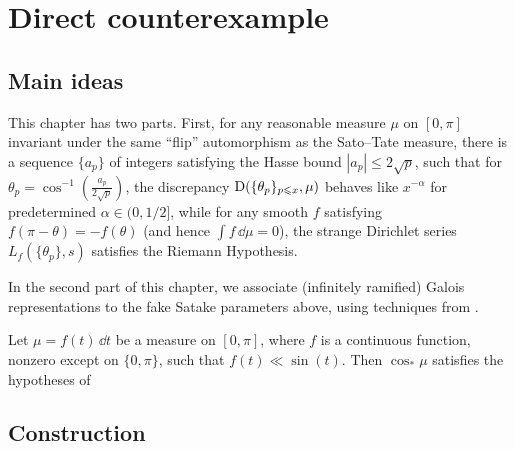 
\chapter{Direct counterexample}





\section{Main ideas}

This chapter has two parts. First, for any reasonable measure $\mu$ on 
$[0,\pi]$ invariant under the same ``flip'' automorphism as the Sato--Tate 
measure, there is a sequence $\{a_p\}$ of integers satisfying the Hasse 
bound $|a_p|\leqslant 2\sqrt p$, such that for 
$\theta_p = \cos^{-1}\left(\frac{a_p}{2\sqrt p}\right)$, the discrepancy 
$\operatorname{D}(\{\theta_p\}_{p\leqslant x},\mu)$ behaves like $x^{-\alpha}$ for 
predetermined $\alpha\in (0,1/2]$, while for any smooth $f$ satisfying 
$f(\pi-\theta) = -f(\theta)$ (and hence $\int f\, \dd\mu = 0$), the 
strange Dirichlet series $L_f(\{\theta_p\},s)$ satisfies the Riemann 
Hypothesis. 

In the second part of this chapter, we associate (infinitely ramified) Galois 
representations to the fake Satake parameters above, using techniques from 
\cite{pande-2011,khare-larsen-ramakrishna-2005}. 

Let $\mu=f(t)\, \dd t$ be a measure on $[0,\pi]$, where $f$ is a continuous 
function, nonzero except on $\{0,\pi\}$, such that $f(t) \ll \sin(t)$. Then 
$\cos_\ast\mu$ satisfies the hypotheses of 





\section{Construction}

